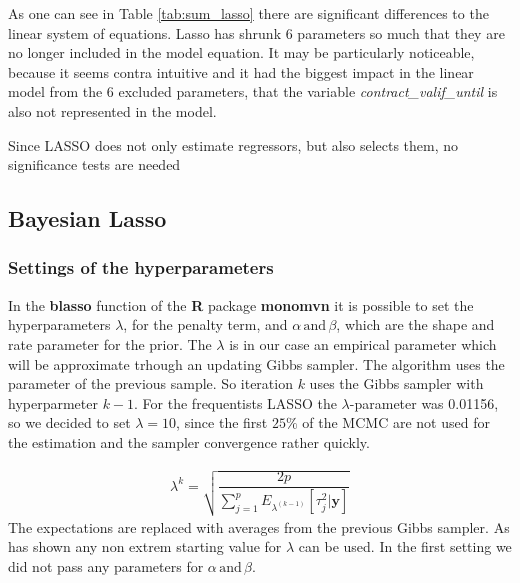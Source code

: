 \documentclass[12pt,a4paper]{article}
\begin{document}
As one can see in Table \ref{tab:sum_lasso} there are significant
differences to the linear system of equations. Lasso has shrunk 6
parameters so much that they are no longer included in the model
equation. It may be particularly noticeable, because it seems contra
intuitive and it had the biggest impact in the linear model from the 6
excluded parameters, that the variable \emph{contract\_valif\_until} is
also not represented in the model.

Since LASSO does not only estimate regressors, but also selects them, no
significance tests are needed

\newpage

\hypertarget{bayesian-lasso-1}{%
\subsection{Bayesian Lasso}\label{bayesian-lasso-1}}

\hypertarget{settings-of-the-hyperparameters}{%
\subsubsection{Settings of the
hyperparameters}\label{settings-of-the-hyperparameters}}

In the \textbf{blasso} function of the \textbf{R} package
\textbf{monomvn} it is possible to set the hyperparameters \(\lambda\),
for the penalty term, and \(\alpha \, \text{and} \, \beta\), which are
the shape and rate parameter for the prior. The \(\lambda\) is in our
case an empirical parameter which will be approximate trhough an
updating Gibbs sampler. The algorithm uses the parameter of the previous
sample. So iteration \(k\) uses the Gibbs sampler with hyperparmeter
\(k-1\). For the frequentists \ac{LASSO} the \(\lambda\)-parameter was
0.01156, so we decided to set \(\lambda = 10\), since the first
\(25 \%\) of the \ac{MCMC} are not used for the estimation and the
sampler convergence rather quickly. \autocite{gramacy_monomvn_2019}

\FloatBarrier

\begin{align*} 
  \lambda^{k} = \sqrt{\dfrac{2p}{\displaystyle \sum_{j = 1}^{p} E_{\lambda^{(k-1)}} [\tau_j^2| \pmb{y}] }}
\end{align*} \FloatBarrier The expectations are replaced with averages
from the previous Gibbs sampler. As \textcite{park_bayesian_2008} has
shown any non extrem starting value for \(\lambda\) can be used. In the
first setting we did not pass any parameters for
\(\alpha \, \text{and} \, \beta\).
\end{document}
